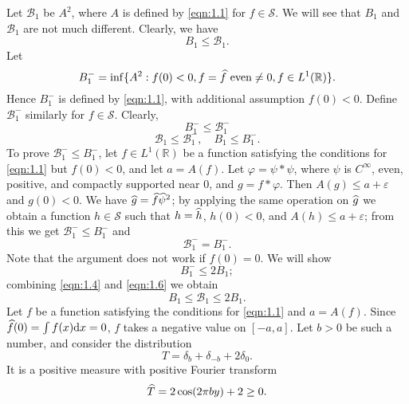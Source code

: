 Let $\mathcal{B}_{1}$ be $A^{2}$, where $A$ is defined by \eqref{eqn:1.1} for $f \in \mathcal{S}$.
We will see that $B_{1}$ and $\mathcal{B}_{1}$ are not much different.
Clearly, we have
\begin{equation}
    \label{eqn:1.2}
    B_{1} \leq \mathcal{B}_{1}.
\end{equation}
Let
\[
    B_{1}^{-} = \inf \{A^{2}: f(0) < 0, f = \widehat{f}\text{ even} \neq 0, f \in L^{1}(\mathbb{R})\}.
\]
Hence $B_{1}^{-}$ is defined by \eqref{eqn:1.1}, with additional assumption $f(0) < 0$.
Define $\mathcal{B}_{1}^{-}$ similarly for $f \in \mathcal{S}$.
Clearly,
\begin{equation}
    \label{eqn:1.3}
    B_{1}^{-} \leq \mathcal{B}_{1}^{-}
\end{equation}
\begin{equation}
    \label{eqn:1.4}
    \mathcal{B}_{1} \leq \mathcal{B}_{1}^{-}, \quad B_{1} \leq B_{1}^{-}.
\end{equation}
To prove $\mathcal{B}_{1}^{-} \leq B_{1}^{-}$, let $f \in L^{1}(\mathbb{R})$ be a function satisfying the conditions for \eqref{eqn:1.1} but $f(0) < 0$, and let $a = A(f)$.
Let $\varphi = \psi \ast \psi$, where $\psi$ is $C^{\infty}$, even, positive, and compactly supported near $0$, and $g = f \ast \varphi$.
Then $A(g) \leq a + \varepsilon$ and $g(0) < 0$.
We have $\widehat{g} = \widehat{f} \widehat{\psi}^{2}$; by applying the same operation on $\widehat{g}$ we obtain a function $h \in \mathcal{S}$ such that $h = \widehat{h}$, $h(0) < 0$, and $A(h) \leq a + \varepsilon$; from this we get $\mathcal{B}_{1}^{-} \leq B_{1}^{-}$ and
\begin{equation}
    \label{eqn:1.5}
    \mathcal{B}_{1}^{-} = B_{1}^{-}.
\end{equation}
Note that the argument does not work if $f(0) = 0$.
We will show
\begin{equation}
    \label{eqn:1.6}
    B_{1}^{-} \leq 2B_{1};
\end{equation}
combining \eqref{eqn:1.4} and \eqref{eqn:1.6} we obtain
\begin{equation}
    \label{eqn:1.7}
    B_{1} \leq \mathcal{B}_{1} \leq 2 B_{1}.
\end{equation}
Let $f$ be a function satisfying the conditions for \eqref{eqn:1.1} and $a = A(f)$.
Since $\widehat{f}(0) = \int f(x) \mathrm{d} x = 0$, $f$ takes a negative value on $[-a, a]$.
Let $b > 0$ be such a number, and consider the distribution
\[
    T = \delta_{b} + \delta_{-b} + 2 \delta_{0}.
\]
It is a positive measure with positive Fourier transform
\[
    \widehat{T} = 2 \cos (2 \pi b y) + 2 \geq 0.
\]
